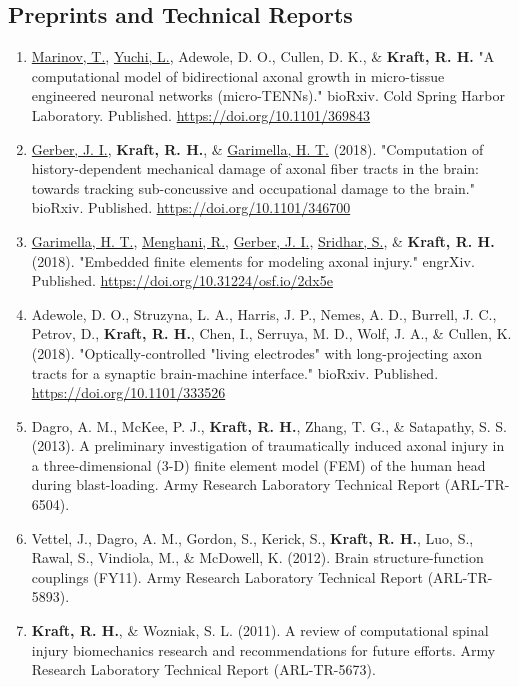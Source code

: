 \documentclass[a4paper,10pt]{article}
\begin{document}
\subsection*{Preprints and Technical Reports}
\begin{enumerate}
\item \underline{Marinov, T.}, \underline{Yuchi, L.}, Adewole, D. O., Cullen, D. K., \& \textbf{\textbf{Kraft,} R. H.} "A computational model of bidirectional axonal growth in micro-tissue engineered neuronal networks (micro-TENNs)." bioRxiv. Cold Spring Harbor Laboratory. Published. \url{https://doi.org/10.1101/369843}
\item \underline{Gerber, J. I.}, \textbf{\textbf{Kraft,} R. H.}, \& \underline{Garimella, H. T.} (2018). "Computation of history-dependent mechanical damage of axonal fiber tracts in the brain: towards tracking sub-concussive and occupational damage to the brain." bioRxiv. Published. \url{https://doi.org/10.1101/346700}
\item \underline{Garimella, H. T.}, \underline{Menghani, R.}, \underline{Gerber, J. I.}, \underline{Sridhar, S.}, \& \textbf{\textbf{Kraft,} R. H.} (2018). "Embedded finite elements for modeling axonal injury." engrXiv. Published. \url{https://doi.org/10.31224/osf.io/2dx5e}
\item Adewole, D. O., Struzyna, L. A., Harris, J. P., Nemes, A. D., Burrell, J. C., Petrov, D., \textbf{\textbf{Kraft,} R. H.}, Chen, I., Serruya, M. D., Wolf, J. A., \& Cullen, K. (2018). "Optically-controlled "living electrodes" with long-projecting axon tracts for a synaptic brain-machine interface." bioRxiv. Published. \url{https://doi.org/10.1101/333526}
\item Dagro, A. M., McKee, P. J., \textbf{\textbf{Kraft,} R. H.}, Zhang, T. G., \& Satapathy, S. S. (2013). A preliminary investigation of traumatically induced axonal injury in a three-dimensional (3-D) finite element model (FEM) of the human head during blast-loading. Army Research Laboratory Technical Report (ARL-TR-6504).
\item Vettel, J., Dagro, A. M., Gordon, S., Kerick, S., \textbf{\textbf{Kraft,} R. H.}, Luo, S., Rawal, S., Vindiola, M., \& McDowell, K. (2012). Brain structure-function couplings (FY11). Army Research Laboratory Technical Report (ARL-TR-5893).
\item \textbf{\textbf{Kraft,} R. H.}, \& Wozniak, S. L. (2011). A review of computational spinal injury biomechanics research and recommendations for future efforts. Army Research Laboratory Technical Report (ARL-TR-5673).

\end{enumerate}
\end{document}
